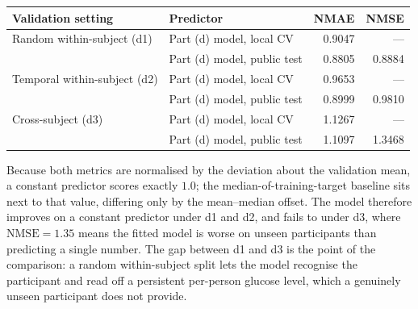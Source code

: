 \documentclass[10pt,a4paper]{article}
\begin{document}
\begin{table}[h]
\centering\small
\begin{tabular}{@{}llrr@{}}
\toprule
\textbf{Validation setting} & \textbf{Predictor} & \textbf{NMAE} & \textbf{NMSE} \\
\midrule
Random within-subject (d1)   & Part (d) model, local CV   & 0.9047 & --- \\
                             & Part (d) model, public test & 0.8805 & 0.8884 \\
\addlinespace
Temporal within-subject (d2) & Part (d) model, local CV   & 0.9653 & --- \\
                             & Part (d) model, public test & 0.8999 & 0.9810 \\
\addlinespace
Cross-subject (d3)           & Part (d) model, local CV   & 1.1267 & --- \\
                             & Part (d) model, public test & 1.1097 & 1.3468 \\
\bottomrule
\end{tabular}
\end{table}

Because both metrics are normalised by the deviation about the validation mean, a
constant predictor scores exactly $1.0$; the median-of-training-target baseline sits
next to that value, differing only by the mean--median offset. The model therefore
improves on a constant predictor under d1 and d2, and fails to under d3, where
$\mathrm{NMSE}=1.35$ means the fitted model is worse on unseen participants than
predicting a single number. The gap between d1 and d3 is the point of the comparison: a random
within-subject split lets the model recognise the participant and read off a
persistent per-person glucose level, which a genuinely unseen participant does
not provide.

\end{document}
